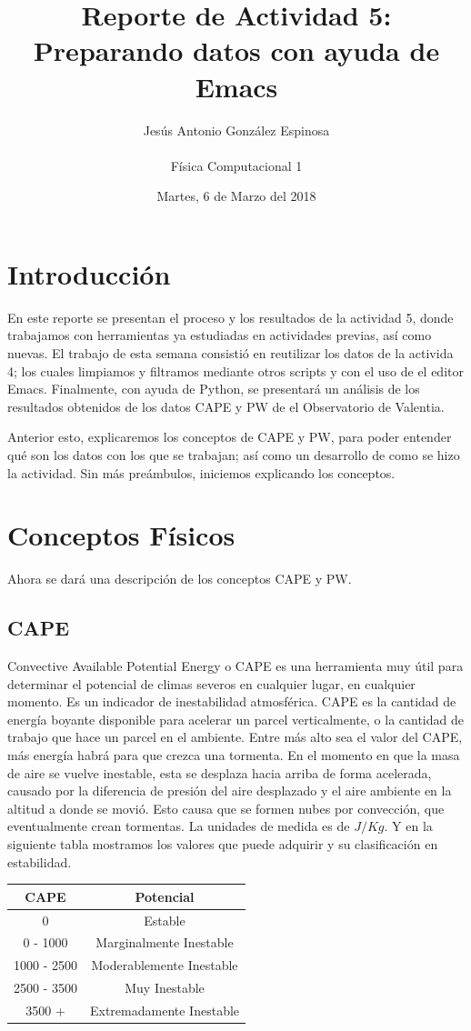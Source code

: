 \documentclass[a4paper]{article}
\title{Reporte de Actividad 5: Preparando datos con ayuda de Emacs}
\author{Jesús Antonio González Espinosa \\ \\ Física Computacional 1}
\date{Martes, 6 de Marzo del 2018}
\begin{document}
\maketitle

\section{Introducción}
En este reporte se presentan el proceso y los resultados de la actividad 5, donde trabajamos con herramientas ya estudiadas en actividades previas, así como nuevas. El trabajo de esta semana consistió en reutilizar los datos de la activida 4; los cuales limpiamos y filtramos mediante otros scripts y con el uso de el editor Emacs. Finalmente, con ayuda de Python, se presentará un análisis de los resultados obtenidos de los datos CAPE y PW de el Observatorio de Valentia.

Anterior  esto, explicaremos los conceptos de CAPE y PW, para poder entender qué son los datos con los que se trabajan; así como un desarrollo de como se hizo la actividad. Sin más preámbulos, iniciemos explicando los conceptos.


\section{Conceptos Físicos}
Ahora se dará una descripción de los conceptos CAPE y PW.

\subsection{CAPE}
Convective Available Potential Energy o CAPE es una herramienta muy útil para determinar el potencial de climas severos en cualquier lugar, en cualquier momento. Es un indicador de inestabilidad atmosférica. 
CAPE es la cantidad de energía boyante disponible para acelerar un parcel verticalmente, o la cantidad de trabajo que hace un parcel en el ambiente. Entre más alto sea el valor del CAPE, más energía habrá para que crezca una tormenta. En el momento en que la masa de aire se vuelve inestable, esta se desplaza hacia arriba de forma acelerada, causado por la diferencia de presión del aire desplazado y el aire ambiente en la altitud a donde se movió. Esto causa que se formen nubes por convección, que eventualmente crean tormentas. 
La unidades de medida es de $J/Kg$. Y en la siguiente tabla mostramos los valores que puede adquirir y su clasificación en estabilidad.
\begin{center}
 \begin{tabular}{||c | c||} 
 \hline
 CAPE & Potencial  \\ [0.5ex] 
 \hline\hline
 0 & Estable \\ 
 \hline
 0 - 1000 & Marginalmente Inestable \\
 \hline
 1000 - 2500 & Moderablemente Inestable \\
 \hline
 2500 - 3500 & Muy Inestable \\
 \hline
 3500 +  & Extremadamente Inestable \\ [1ex] 
 \hline
\end{tabular}
\end{center}
\end{document}
